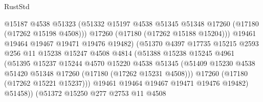 \begin{lexlean}{RustStd}
\begin{coremodule}
                                  @15187
                                  @4538
                                  @51323
                                  (@51332
                                    @15197
                                    @4538
                                    @51345
                                    @51348
                                    @17260
                                    (@17180 (@17262 @15198 @4508)))
                                  @17260
                                  (@17180 (@17262 @15188 @15204)))
                                @19461
                                @19464
                                @19467
                                @19471
                                @19476
                                @19482)
                              (@51370
                                @4397
                                @17735
                                @15215
                                @2593
                                @256
                                @11
                                @15238
                                @15247
                                @4508
                                @4814
                                (@51388
                                  @15238
                                  @15245
                                  @4961
                                  (@51395
                                    @15237
                                    @15244
                                    @4570
                                    @15220
                                    @4538
                                    @51345
                                    (@51409
                                      @15230
                                      @4538
                                      @51420
                                      @51348
                                      @17260
                                      (@17180 (@17262 @15231 @4508)))
                                    @17260
                                    (@17180 (@17262 @15221 @15237)))
                                  @19461
                                  @19464
                                  @19467
                                  @19471
                                  @19476
                                  @19482)
                                @51458))
                            (@51372
                              @15250
                              @277
                              @2753
                              @11
                              @4508

\end{coremodule}
\end{lexlean}

